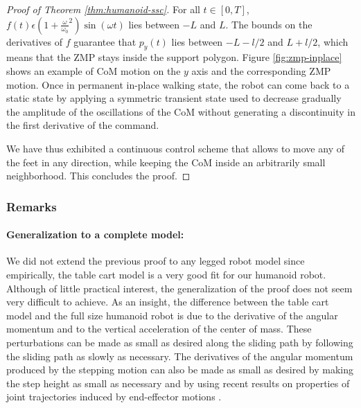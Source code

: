 \begin{proof}[Proof of Theorem \ref{thm:humanoid-ssc}]
For all $t \in [0,T]$, $f(t) \epsilon (1 + \frac{\omega}{\omega_0}^2)
\sin (\omega t)$ lies between $-L$ and $L$. The bounds on the
derivatives of $f$ guarantee that $p_y(t)$ lies between $-L- l/2$ and
$L+ l/2$, which means that the ZMP stays inside the support polygon.
Figure  \ref{fig:zmp-inplace} shows an example of CoM motion on the $y$
axis and the corresponding ZMP motion. Once in permanent in-place
walking state, the robot can come back to a static state by applying a
symmetric transient state used to decrease gradually the amplitude of
the oscillations of the CoM without generating a discontinuity in the
first derivative of the command.

We have thus exhibited a continuous control scheme that allows to move
any of the feet in any direction, while keeping the CoM inside an
arbitrarily small neighborhood. This concludes the proof.
\end{proof}

\subsubsection{Remarks}
\paragraph{Generalization to a complete model:} 
We did not extend the previous proof to any legged robot model since
empirically, the table cart model is a very good fit for our humanoid
robot. Although of little practical interest, the generalization of
the proof does not seem very difficult to achieve. As an insight, the
difference between the table cart model and the full size humanoid
robot is due to the derivative of the angular momentum and to the
vertical acceleration of the center of mass. These perturbations can
be made as small as desired along the sliding path by following the
sliding path as slowly as necessary. The derivatives of the angular
momentum produced by the stepping motion can also be made as small as
desired by making the step height as small as necessary and by using
recent results on properties of joint trajectories induced by
end-effector motions \cite{Zanchettin6084763}.

